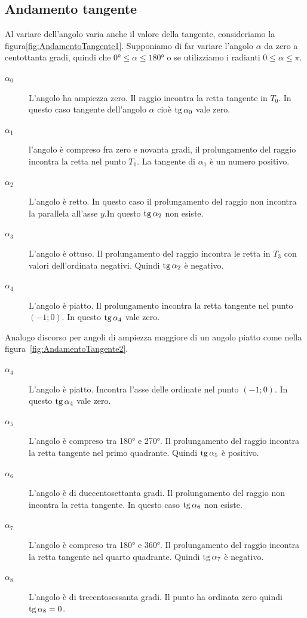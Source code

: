 \subsection{Andamento tangente}
\label{sec:AndamentoTangente}
Al variare dell'angolo varia anche il valore della tangente, consideriamo la figura\nobs\vref{fig:AndamentoTangente1}. Supponiamo di far variare l'angolo $\alpha$ da zero a centottanta gradi, quindi che $\ang{0}\leq\alpha\leq\ang{180}$ o se utilizziamo i radianti $0\leq\alpha\leq\pi$. 
\begin{description}
	\item[$\alpha_0$] L'angolo ha ampiezza zero. Il raggio incontra la retta tangente in  $T_0$. In questo caso  tangente  dell'angolo $\alpha$ cioè $\operatorname{tg}\alpha_0$ vale zero.
	\item [$\alpha_1$] l'angolo è compreso fra zero e novanta gradi, il prolungamento del raggio  incontra la retta nel punto $T_1$. La tangente di $\alpha_1$ è un numero positivo.
	\item [$\alpha_2$] L'angolo  è retto. In questo caso il prolungamento del raggio non incontra la parallela all'asse $y$.In questo    $\operatorname{tg}\alpha_2$ non esiste. 
	\item [$\alpha_3$]  L'angolo è ottuso. Il prolungamento del raggio incontra le retta in $T_3$  con valori dell'ordinata negativi. Quindi $\operatorname{tg}\alpha_2$ è negativo.
	\item [$\alpha_4$] L'angolo  è  piatto. Il  prolungamento incontra la retta tangente  nel punto $(-1;0)$. In questo  $\operatorname{tg}\alpha_4$ vale zero.
\end{description}
Analogo discorso per angoli di ampiezza  maggiore di un angolo  piatto come nella figura~\vref{fig:AndamentoTangente2}.
\begin{description}
	\item [$\alpha_4$] L'angolo è piatto. Incontra l'asse delle ordinate nel punto $(-1;0)$. In questo  $\operatorname{tg}\alpha_4$ vale zero.
	\item [$\alpha_5$] L'angolo è compreso tra \ang{180} e \ang{270}. Il prolungamento del raggio incontra la retta tangente  nel primo quadrante. Quindi $\operatorname{tg}\alpha_5$ è positivo.
	\item [$\alpha_6$] L'angolo è di duecentosettanta gradi. Il prolungamento del raggio non incontra la retta  tangente. In questo caso  $\operatorname{tg}\alpha_6$ non esiste. 
	\item [$\alpha_7$] L'angolo è compreso tra \ang{180} e \ang{360}. Il prolungamento del raggio incontra la retta tangente nel quarto quadrante. Quindi $\operatorname{tg}\alpha_7$ è negativo.
	\item [$\alpha_8$] L'angolo è di trecentosessanta gradi. Il punto ha ordinata zero quindi  $\operatorname{tg}\alpha_8=0$.
\end{description}
